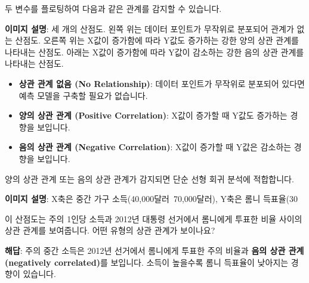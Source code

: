 \documentclass[11pt,a4paper]{article}
\theoremstyle{definition}
\begin{document}
\begin{tcolorbox}[infobox, title=가능한 선형 관계 (Possible Linear Relationships)]
두 변수를 플로팅하여 다음과 같은 관계를 감지할 수 있습니다.
\begin{center}
\end{center}
\textbf{이미지 설명}: 세 개의 산점도. 왼쪽 위는 데이터 포인트가 무작위로 분포되어 관계가 없는 산점도. 오른쪽 위는 X값이 증가함에 따라 Y값도 증가하는 강한 양의 상관 관계를 나타내는 산점도. 아래는 X값이 증가함에 따라 Y값이 감소하는 강한 음의 상관 관계를 나타내는 산점도.

\begin{itemize}
    \item \textbf{상관 관계 없음 (No Relationship)}: 데이터 포인트가 무작위로 분포되어 있다면 예측 모델을 구축할 필요가 없습니다.
    \item \textbf{양의 상관 관계 (Positive Correlation)}: X값이 증가할 때 Y값도 증가하는 경향을 보입니다.
    \item \textbf{음의 상관 관계 (Negative Correlation)}: X값이 증가할 때 Y값은 감소하는 경향을 보입니다.
\end{itemize}
양의 상관 관계 또는 음의 상관 관계가 감지되면 단순 선형 회귀 분석에 적합합니다.
\end{tcolorbox}

\begin{tcolorbox}[examplebox, title=연습: 상관 관계 유형 파악하기]
\begin{center}
\end{center}
\textbf{이미지 설명}: X축은 중간 가구 소득(40,000달러~70,000달러), Y축은 롬니 득표율(30%

이 산점도는 주의 1인당 소득과 2012년 대통령 선거에서 롬니에게 투표한 비율 사이의 상관 관계를 보여줍니다. 어떤 유형의 상관 관계가 보이나요?

\textbf{해답}: 주의 중간 소득은 2012년 선거에서 롬니에게 투표한 주의 비율과 \textbf{음의 상관 관계(negatively correlated)}를 보입니다. 소득이 높을수록 롬니 득표율이 낮아지는 경향이 있습니다.
\end{tcolorbox}
\end{document}
